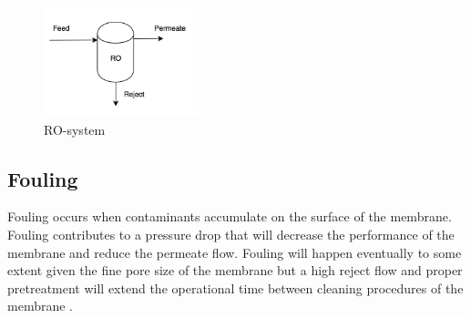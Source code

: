\begin{figure}[h]
    \centering
    \includegraphics[width=0.4\textwidth]{ROsystem}
    \caption{RO-system}
    \label{fig:ROsystem}
\end{figure}





\subsection{Fouling}
Fouling occurs when contaminants accumulate on the surface of the membrane. Fouling contributes to a pressure drop that will decrease the performance of the membrane and reduce the permeate flow. Fouling will happen eventually to some extent given the fine pore size of the membrane but a high reject flow and proper pretreatment will extend the operational time between cleaning procedures of the membrane \cite{3}. 

